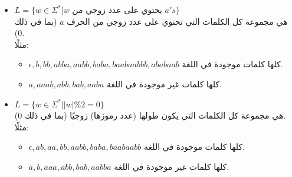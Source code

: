 \documentclass[12pt]{article}
\begin{document}
\begin{itemize}
    \item $L = \{w \in \Sigma^* | w \text{ يحتوي على عدد زوجي من } a's \}$ \\
    هي مجموعة كل الكلمات التي تحتوي على عدد زوجي من الحرف $a$ (بما في ذلك 0). \\
    مثلًا:
    \begin{itemize}
        \item $\epsilon, b, bb, abba, aabb, baba, baabaabbb, ababaab$ كلها كلمات موجودة في اللغة.
        \item $a, aaab, abb, bab, aaba$ كلها كلمات غير موجودة في اللغة.
    \end{itemize}

    \item $L = \{w \in \Sigma^* | \left| w \right| \% 2 = 0 \}$ \\
    هي مجموعة كل الكلمات التي يكون طولها (عدد رموزها) زوجيًا (بما في ذلك 0). \\
    مثلًا:
    \begin{itemize}
        \item $\epsilon, ab, aa, bb, aabb, baba, baabaabb$ كلها كلمات موجودة في اللغة.
        \item $a, b, aaa, abb, bab, aabba$ كلها كلمات غير موجودة في اللغة.
    \end{itemize}

\end{itemize}
\end{document}

